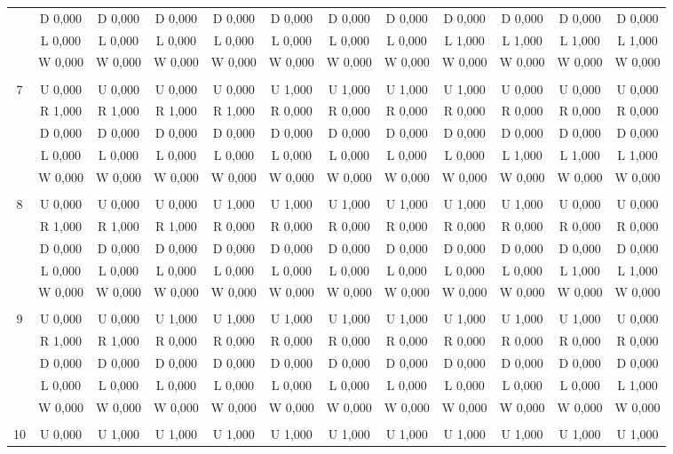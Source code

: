 \begin{table}[htbp]
\begin{tiny}
\begin{tabular}{c|c|c|c|c|c|c|c|c|c|c|c|}
&D 0,000&D 0,000&D 0,000&D 0,000&D 0,000&D 0,000&D 0,000&D 0,000&D 0,000&D 0,000&D 0,000\\
&L 0,000&L 0,000&L 0,000&L 0,000&L 0,000&L 0,000&L 0,000&L 1,000&L 1,000&L 1,000&L 1,000\\
&W 0,000&W 0,000&W 0,000&W 0,000&W 0,000&W 0,000&W 0,000&W 0,000&W 0,000&W 0,000&W 0,000\\
\hline \\
7&U 0,000&U 0,000&U 0,000&U 0,000&U 1,000&U 1,000&U 1,000&U 1,000&U 0,000&U 0,000&U 0,000\\
&R 1,000&R 1,000&R 1,000&R 1,000&R 0,000&R 0,000&R 0,000&R 0,000&R 0,000&R 0,000&R 0,000\\
&D 0,000&D 0,000&D 0,000&D 0,000&D 0,000&D 0,000&D 0,000&D 0,000&D 0,000&D 0,000&D 0,000\\
&L 0,000&L 0,000&L 0,000&L 0,000&L 0,000&L 0,000&L 0,000&L 0,000&L 1,000&L 1,000&L 1,000\\
&W 0,000&W 0,000&W 0,000&W 0,000&W 0,000&W 0,000&W 0,000&W 0,000&W 0,000&W 0,000&W 0,000\\
\hline \\
8&U 0,000&U 0,000&U 0,000&U 1,000&U 1,000&U 1,000&U 1,000&U 1,000&U 1,000&U 0,000&U 0,000\\
&R 1,000&R 1,000&R 1,000&R 0,000&R 0,000&R 0,000&R 0,000&R 0,000&R 0,000&R 0,000&R 0,000\\
&D 0,000&D 0,000&D 0,000&D 0,000&D 0,000&D 0,000&D 0,000&D 0,000&D 0,000&D 0,000&D 0,000\\
&L 0,000&L 0,000&L 0,000&L 0,000&L 0,000&L 0,000&L 0,000&L 0,000&L 0,000&L 1,000&L 1,000\\
&W 0,000&W 0,000&W 0,000&W 0,000&W 0,000&W 0,000&W 0,000&W 0,000&W 0,000&W 0,000&W 0,000\\
\hline \\
9&U 0,000&U 0,000&U 1,000&U 1,000&U 1,000&U 1,000&U 1,000&U 1,000&U 1,000&U 1,000&U 0,000\\
&R 1,000&R 1,000&R 0,000&R 0,000&R 0,000&R 0,000&R 0,000&R 0,000&R 0,000&R 0,000&R 0,000\\
&D 0,000&D 0,000&D 0,000&D 0,000&D 0,000&D 0,000&D 0,000&D 0,000&D 0,000&D 0,000&D 0,000\\
&L 0,000&L 0,000&L 0,000&L 0,000&L 0,000&L 0,000&L 0,000&L 0,000&L 0,000&L 0,000&L 1,000\\
&W 0,000&W 0,000&W 0,000&W 0,000&W 0,000&W 0,000&W 0,000&W 0,000&W 0,000&W 0,000&W 0,000\\
\hline \\
10&U 0,000&U 1,000&U 1,000&U 1,000&U 1,000&U 1,000&U 1,000&U 1,000&U 1,000&U 1,000&U 1,000\\

\end{tabular}
\end{tiny}
\end{table}
